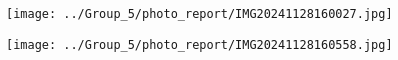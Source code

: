 \vspace{10pt}

\begin{minipage}{0.48\textwidth}
    \centering
    \texttt{[image: ../Group\_5/photo\_report/IMG20241128160027.jpg]}
\end{minipage}%
\begin{minipage}{0.48\textwidth}
    \centering
    \texttt{[image: ../Group\_5/photo\_report/IMG20241128160558.jpg]}
\end{minipage}
